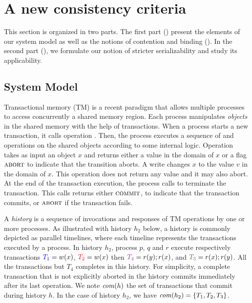 \section{A new consistency criteria}

This section is organized in two parts.
The first part () present the elements of our system model as well as the notions of contention and binding ().
In the second part (), we formulate our notion of stricter serializability and study its applicability.

\subsection{System Model}

Transactional memory (TM) is a recent paradigm that allows multiple processes to access concurrently a shared memory region.
Each process manipulates \emph{objects} in the shared memory with the help of transactions.
When a process starts a new transaction, it calls operation \stmBeginFunction.
Then, the process executes a sequence of \stmReadFunction and \stmWriteFunction operations on the shared objects according to some internal logic.
Operation  takes as input an object $x$ and returns either a value in the domain of $x$ or a flag $\text{\textsc{abort}}$ to indicate that the transition aborts.
A write  changes $x$ to the value $v$ in the domain of $x$.
This operation does not return any value and it may also abort.
At the end of the transaction execution, the process calls \stmTryCommitFunction to terminate the transaction.
This calls returns either $\text{\textsc{commit}}$, to indicate that the transaction commits, or $\text{\textsc{abort}}$ if the transaction fails.

A \emph{history} is a sequence of invocations and responses of TM operations by one or more processes.
As illustrated with history $h_2$ below, a history is commonly depicted as parallel timelines, where each timeline represents the transactions executed by a process.
In history $h_2$, process $p$, $q$ and $r$ execute respectively transactions ${\color{blue}{T_1}}=w(x)$, ${\color{red}{T_2}}=w(x)$ then ${\color{Purple}{T_4}}=r(y);r(x)$, and ${\color{OliveGreen}{T_3}}=r(x);r(y)$.
All the transactions but $T_4$ completes in this history.
For simplicity, a complete transaction that is not explicitly aborted in the history commits immediately after its last operation.
We note $\committed{h}$ the set of transactions that commit during history $h$.
In the case of history $h_2$, we have $\committed{h_2}=\{T_1,T_2,T_3\}$.


